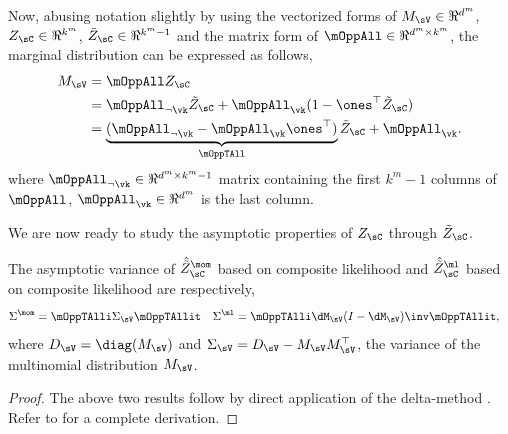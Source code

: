 Now, abusing notation slightly by using the vectorized forms of $M_\sV
\in \Re^{d^m}$, $Z_\sC \in \Re^{k^m}$, $\tilde Z_\sC \in \Re^{k^m-1}$
and the matrix form of $\mOppAll \in \Re^{d^m \times k^m}$, the marginal
distribution can be expressed as follows,
\begin{align*}
  M_\sV 
        &= \mOppAll Z_\sC \\
        &= \mOppAll_{\neg \vk} \tilde Z_\sC + \mOppAll_{\vk} (1 - \ones^\top \tilde Z_\sC) \\
        &= \underbrace{(\mOppAll_{\neg \vk} -  \mOppAll_{\vk}\ones^\top)}_{\mOppTAll} \tilde Z_\sC + \mOppAll_{\vk}.
\end{align*}
where $\mOppAll_{\neg \vk} \in \Re^{d^m \times k^m - 1}$ matrix containing the
first $k^m-1$ columns of $\mOppAll$, $\mOppAll_\vk \in \Re^{d^m}$ is the
last column. %

We are now ready to study the asymptotic properties of $Z_\sC$ through
$\tilde{Z}_\sC$.

\providecommand{\hatt}[1] {\hat{\tilde{#1}}}
\begin{lemma}
  \label{lem:mom-pw-variance}
  The asymptotic variance of $\hatt Z^\mom_{\sC}$ based on composite likelihood and 
  $\hatt Z^\ml_{\sC}$ based on composite likelihood are respectively,
  \begin{align*}
    \Sigma^{\mom} &= \mOppTAlli \Sigma_\sV \mOppTAllit
    &
    \Sigma^{\ml} &= \mOppTAlli \dM_\sV (I - \dM_\sV)\inv \mOppTAllit,
  \end{align*}
  where $D_\sV = \diag(M_\sV)$ and $\Sigma_\sV = D_\sV - M_\sV
  M_\sV^\top$, the variance of the multinomial distribution $M_\sV$.
\end{lemma}
\begin{proof}
  The above two results follow by direct application of the delta-method
  \cite{vaart98asymptotic}. Refer to  for
  a complete derivation.
\end{proof}



